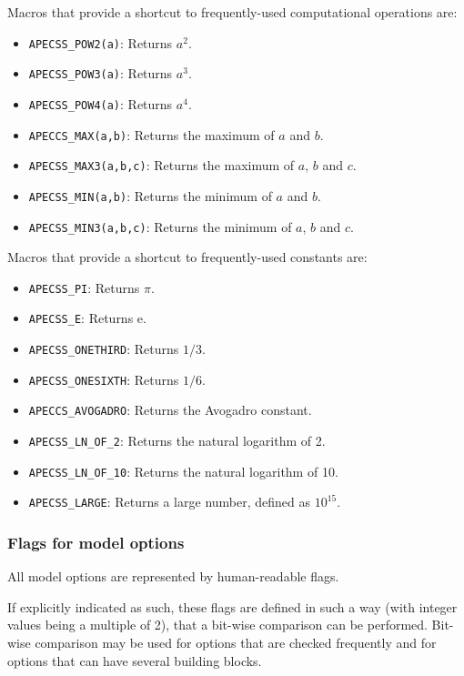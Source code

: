 Macros that provide a shortcut to frequently-used computational operations are:\vspace{-1em}
\begin{itemize}[noitemsep]
  \item {\tt APECSS\_POW2(a)}: Returns $a^2$.
  \item {\tt APECSS\_POW3(a)}: Returns $a^3$.
  \item {\tt APECSS\_POW4(a)}: Returns $a^4$.
  \item {\tt APECCS\_MAX(a,b)}: Returns the maximum of $a$ and $b$.
  \item {\tt APECSS\_MAX3(a,b,c)}: Returns the maximum of $a$, $b$ and $c$.
  \item {\tt APECSS\_MIN(a,b)}: Returns the minimum of $a$ and $b$.
  \item {\tt APECSS\_MIN3(a,b,c)}: Returns the minimum of $a$, $b$ and $c$.
\end{itemize}

Macros that provide a shortcut to frequently-used constants are:\vspace{-1em}
\begin{itemize}[noitemsep]
  \item {\tt APECSS\_PI}: Returns $\pi$.
  \item {\tt APECSS\_E}: Returns $\mathrm{e}$.
  \item {\tt APECSS\_ONETHIRD}: Returns $1/3$.
  \item {\tt APECSS\_ONESIXTH}: Returns $1/6$.
  \item {\tt APECCS\_AVOGADRO}: Returns the Avogadro constant.
  \item {\tt APECSS\_LN\_OF\_2}: Returns the natural logarithm of 2.
  \item {\tt APECSS\_LN\_OF\_10}: Returns the natural logarithm of 10.
  \item {\tt APECSS\_LARGE}: Returns a large number, defined as $10^{15}$.
\end{itemize}

\subsubsection{Flags for model options}

All model options are represented by human-readable flags. 

If explicitly indicated as such, these flags are defined in such a way (with integer values being a multiple of 2), that a bit-wise comparison can be performed. Bit-wise comparison may be used for options that are checked frequently and for options that can have several building blocks.

